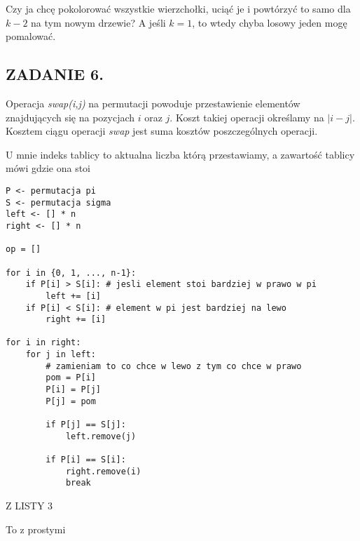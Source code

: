 \documentclass{article}
\begin{document}
Czy ja chcę pokolorować wszystkie wierzchołki, uciąć je i powtórzyć to samo dla $k-2$ na tym nowym drzewie? A jeśli $k=1$, to wtedy chyba losowy jeden mogę pomalować.

\subsection*{ZADANIE 6.}

\begin{problem}[9]{}
Operacja \emph{swap(i,j)} na permutacji powoduje przestawienie elementów znajdujących się na pozycjach $i$ oraz $j$. Koszt takiej operacji określamy na $|i-j|$. Kosztem ciągu operacji \emph{swap} jest suma kosztów poszczególnych operacji.
\end{problem}

U mnie indeks tablicy to aktualna liczba którą przestawiamy, a zawartość tablicy mówi gdzie ona stoi

\begin{lstlisting}
P <- permutacja pi
S <- permutacja sigma
left <- [] * n
right <- [] * n

op = []

for i in {0, 1, ..., n-1}:
    if P[i] > S[i]: # jesli element stoi bardziej w prawo w pi
        left += [i]
    if P[i] < S[i]: # element w pi jest bardziej na lewo
        right += [i]

for i in right:
    for j in left:
        # zamieniam to co chce w lewo z tym co chce w prawo
        pom = P[i]
        P[i] = P[j]
        P[j] = pom

        if P[j] == S[j]:
            left.remove(j)

        if P[i] == S[i]:
            right.remove(i)
            break
\end{lstlisting}

\begin{problem}[2]{}
Z LISTY 3

To z prostymi
\end{problem}
\end{document}
